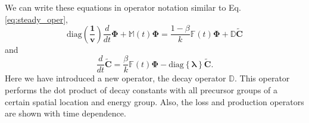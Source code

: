 \documentclass{ansconf}
\numberwithin{equation}{section}
\begin{document}
We can write these equations in operator notation similar to Eq. \eqref{eq:steady_oper},
\begin{equation}
    \mathrm{diag}\left(\boldsymbol{\frac{1}{v}}\right)\frac{d}{dt}\boldsymbol{\Phi} + \mathbb{M}\left(t\right)\boldsymbol{\Phi} = \frac{1-\beta}{k}\mathbb{F}\left(t\right)\boldsymbol{\Phi} + \mathbb{D}\widetilde{\boldsymbol{C}}
\end{equation}
and
\begin{equation} \label{eq:prec}
    \frac{d}{dt}\widetilde{\boldsymbol{C}} = \frac{\beta}{k}\mathbb{F}\left(t\right)\boldsymbol{\Phi} -  \mathrm{diag}\left\lbrace\boldsymbol{\lambda}\right\rbrace
    \widetilde{\boldsymbol{C}}.
\end{equation}
Here we have introduced a new operator, the decay operator $\mathbb{D}$. This operator performs the dot product of decay constants with all precursor groups of a certain spatial location and energy group. Also, the loss and production operators are shown with time dependence. 
\end{document}
